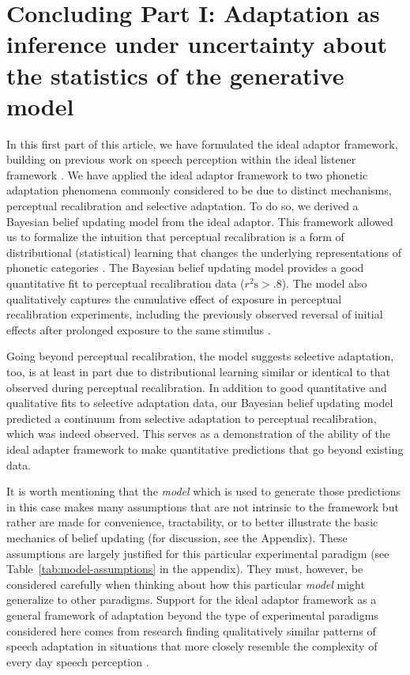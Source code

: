 \section{Concluding Part I: Adaptation as inference under uncertainty about the statistics of the generative model} 
\label{sec:conclusion-part1}

In this first part of this article, we have formulated the ideal adaptor framework, building on previous work on speech perception within the ideal listener framework \autocite{Clayards2008,Feldman2009a,Norris2008,Sonderegger2010}. We have applied the ideal adaptor framework to two phonetic adaptation phenomena commonly considered to be due to distinct mechanisms, perceptual recalibration and selective adaptation. To do so, we derived a Bayesian belief updating model from the ideal adaptor. This framework allowed us to formalize the intuition that perceptual recalibration is a form of distributional (statistical) learning that changes the underlying representations of phonetic categories \autocite[e.g.,][]{Norris2003,Kraljic2005,Maye2008a,Bertelson2003}. The Bayesian belief updating model provides a good quantitative fit to perceptual recalibration data ($r^2\mathrm{s}> .8$). The model also qualitatively captures the cumulative effect of exposure in perceptual recalibration experiments, including the previously observed reversal of initial effects after prolonged exposure to the same stimulus \autocite{Vroomen2007}.

Going beyond perceptual recalibration, the model suggests selective adaptation, too, is at least in part due to distributional learning similar or identical to that observed during perceptual recalibration. In addition to good quantitative and qualitative fits to selective adaptation data, our Bayesian belief updating model predicted a continuum from selective adaptation to perceptual recalibration, which was indeed observed. This serves as a demonstration of the ability of the ideal adapter framework to make quantitative predictions that go beyond existing data.

It is worth mentioning that the \emph{model} which is used to generate those predictions in this case makes many assumptions that are not intrinsic to the framework but rather are made for convenience, tractability, or to better illustrate the basic mechanics of belief updating (for discussion, see the Appendix). These assumptions are largely justified for this particular experimental paradigm (see Table~\ref{tab:model-assumptions} in the appendix). They must, however, be considered carefully when thinking about how this particular \emph{model} might generalize to other paradigms. Support for the ideal adaptor framework as a general framework of adaptation beyond the type of experimental paradigms considered here comes from research finding qualitatively similar patterns of speech adaptation in situations that more closely resemble the complexity of every day speech perception \autocite{Eisner2006,Reinisch2014}.

